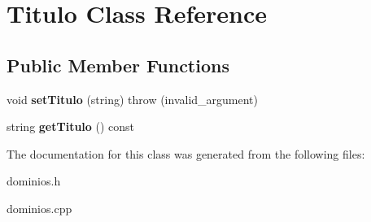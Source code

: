 \hypertarget{classTitulo}{}\section{Titulo Class Reference}
\label{classTitulo}
\subsection*{Public Member Functions}
\begin{DoxyCompactItemize}
\item 
\mbox{\label{classTitulo_ac4b3e70d24f498a9085ae9d01d51ef12}} 
void {\bfseries set\+Titulo} (string)  throw (invalid\+\_\+argument)
\item 
\mbox{\label{classTitulo_ad13d7166263fe5b8053532a820165390}} 
string {\bfseries get\+Titulo} () const
\end{DoxyCompactItemize}


The documentation for this class was generated from the following files\+:\begin{DoxyCompactItemize}
\item 
dominios.\+h\item 
dominios.\+cpp\end{DoxyCompactItemize}
